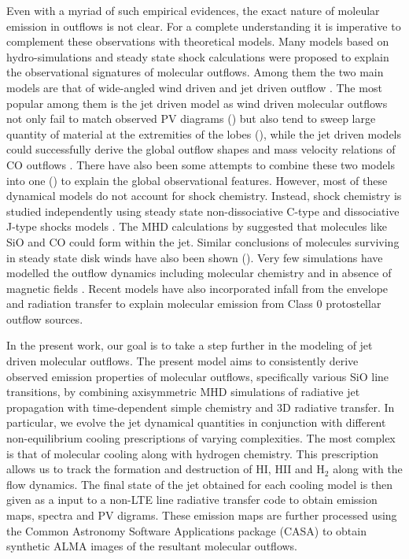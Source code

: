 \documentclass[useAMS,usenatbib]{mn2e}
\begin{document}
Even with a myriad of such empirical evidences, the exact nature of
moleular emission in outflows is not clear. For a complete understanding it is imperative
to complement these observations with theoretical models. Many models
based on hydro-simulations and steady state shock calculations
were proposed to explain the observational signatures of molecular
outflows. Among them the two main models are that of wide-angled wind
driven \cite{Shu:1991p14071} and jet driven outflow
\cite{Canto:1991p14123}. 
The most popular among them is the jet driven model as wind
driven molecular outflows not only fail to match observed PV diagrams (\citealt{Cabrit:1992p14098})
but also tend to sweep large quantity of material at the extremities
of the lobes (\citealt{Masson:1992p14101}), while the jet driven models could successfully
derive the global outflow shapes and mass velocity relations of CO
outflows \citep{Raga:1993p9948,
  Masson:1993p9661,Downes:2003p9946,Downes:2007p9514}. 
There have also been some attempts to combine these two
models into one (\citealt{Shang:2006p14268}) to explain the global observational features. 
However, most of these dynamical models do not
account for shock chemistry. Instead, shock chemistry is studied
independently using steady state non-dissociative C-type and
dissociative J-type shocks models \citep{Neufeld:1989p11689, Schilke:1997p14140,Flower:2003p11236}. 
The MHD calculations by \cite{Glassgold:1991p13703} suggested that molecules
like SiO and CO could form within the jet. Similar conclusions of
molecules surviving in steady state disk winds have also been shown
(\citealt{Panoglou:2012p10039}). 
Very few simulations have modelled the outflow
dynamics including molecular chemistry and in absence of
magnetic fields \citep{Raga:1995p12965, Smith:2003p9985}. 
Recent models have also incorporated
infall from the envelope \citep{Rawlings:2013p14920} and radiation
transfer \citep{Offner:2011p14861} to explain molecular 
emission from Class 0 protostellar outflow sources. 



%
In the present work, our goal is to take a step further in the modeling of
jet driven molecular outflows. The present model aims to consistently derive observed emission properties of molecular outflows, specifically various SiO line
transitions, by combining axisymmetric MHD simulations of
radiative jet propagation with time-dependent simple chemistry and 3D radiative
transfer. In particular, we evolve the jet dynamical
quantities in conjunction with different non-equilibrium cooling
prescriptions of varying complexities. The most complex is that of
molecular cooling along with hydrogen chemistry. This prescription
allows us to track the formation and destruction of 
HI, HII and H$_{2}$ along with the flow dynamics. 
The final state of the jet obtained for each cooling model is then
given as a input to a non-LTE line radiative transfer code
to obtain emission maps, spectra and PV digrams. These emission maps
are further processed using the Common Astronomy Software Applications
package (CASA) to obtain synthetic ALMA images of the resultant molecular outflows.
%
\end{document}
